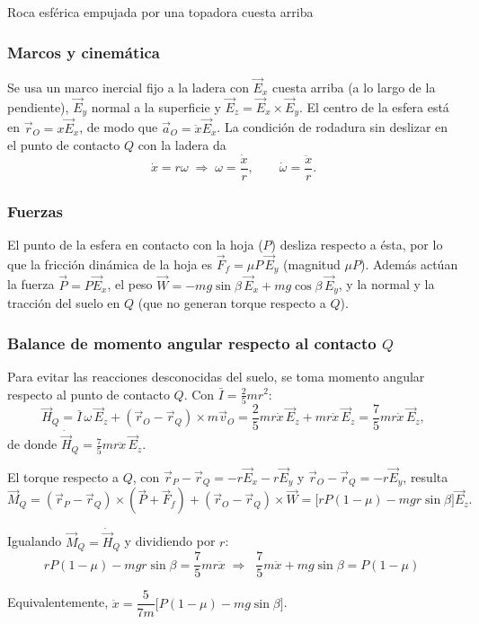 \begin{solucion}{Roca esférica empujada por una topadora cuesta arriba}
\subsubsection*{Marcos y cinemática}

Se usa un marco inercial fijo a la ladera con $\vec{E}_x$ cuesta arriba (a lo largo de la
pendiente), $\vec{E}_y$ normal a la superficie y $\vec{E}_z=\vec{E}_x\times\vec{E}_y$. El
centro de la esfera está en $\vec{r}_O=x\vec{E}_x$, de modo que $\vec{a}_O=\ddot{x}\vec{E}_x$.
La condición de rodadura sin deslizar en el punto de contacto $Q$ con la ladera da
$$\dot{x}=r\omega \;\Longrightarrow\; \omega=\frac{\dot{x}}{r},\qquad \dot\omega=\frac{\ddot{x}}{r}.$$

\subsubsection*{Fuerzas}

El punto de la esfera en contacto con la hoja ($P$) desliza respecto a ésta, por lo que la
fricción dinámica de la hoja es $\vec{F}_f=\mu P\,\vec{E}_y$ (magnitud $\mu P$). Además actúan
la fuerza $\vec{P}=P\vec{E}_x$, el peso $\vec{W}=-mg\sin\beta\,\vec{E}_x + mg\cos\beta\,\vec{E}_y$,
y la normal y la tracción del suelo en $Q$ (que no generan torque respecto a $Q$).

\subsubsection*{Balance de momento angular respecto al contacto $Q$}

Para evitar las reacciones desconocidas del suelo, se toma momento angular respecto al punto
de contacto $Q$. Con $\bar{I}=\tfrac25 mr^2$:
$$\vec{H}_Q = \bar{I}\,\omega\,\vec{E}_z + (\vec{r}_O-\vec{r}_Q)\times m\vec{v}_O
= \frac{2}{5}mr\dot{x}\,\vec{E}_z + mr\dot{x}\,\vec{E}_z = \frac{7}{5}mr\dot{x}\,\vec{E}_z,$$
de donde $\dot{\vec{H}}_Q = \tfrac75 mr\ddot{x}\,\vec{E}_z$.

El torque respecto a $Q$, con $\vec{r}_P-\vec{r}_Q=-r\vec{E}_x-r\vec{E}_y$ y
$\vec{r}_O-\vec{r}_Q=-r\vec{E}_y$, resulta
$$\vec{M}_Q = (\vec{r}_P-\vec{r}_Q)\times(\vec{P}+\vec{F}_f) + (\vec{r}_O-\vec{r}_Q)\times\vec{W}
= \big[rP(1-\mu) - mgr\sin\beta\big]\vec{E}_z.$$

Igualando $\vec{M}_Q=\dot{\vec{H}}_Q$ y dividiendo por $r$:
$$rP(1-\mu) - mgr\sin\beta = \frac{7}{5}mr\ddot{x}
\;\Longrightarrow\;
\boxed{\;\frac{7}{5}m\ddot{x} + mg\sin\beta = P(1-\mu)\;}$$

Equivalentemente, $\ddot{x} = \dfrac{5}{7m}\big[P(1-\mu) - mg\sin\beta\big]$.
\end{solucion}

